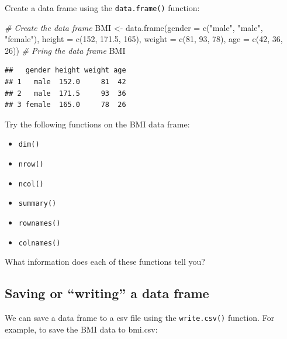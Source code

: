 \documentclass[
]{book}
\newenvironment{Shaded}{\begin{snugshade}}{\end{snugshade}}
\newcommand{\AttributeTok}[1]{\textcolor[rgb]{0.77,0.63,0.00}{#1}}
\newcommand{\CommentTok}[1]{\textcolor[rgb]{0.56,0.35,0.01}{\textit{#1}}}
\newcommand{\DecValTok}[1]{\textcolor[rgb]{0.00,0.00,0.81}{#1}}
\newcommand{\FloatTok}[1]{\textcolor[rgb]{0.00,0.00,0.81}{#1}}
\newcommand{\FunctionTok}[1]{\textcolor[rgb]{0.00,0.00,0.00}{#1}}
\newcommand{\NormalTok}[1]{#1}
\newcommand{\OtherTok}[1]{\textcolor[rgb]{0.56,0.35,0.01}{#1}}
\newcommand{\StringTok}[1]{\textcolor[rgb]{0.31,0.60,0.02}{#1}}
\providecommand{\tightlist}{%
  \setlength{\itemsep}{0pt}\setlength{\parskip}{0pt}}
\begin{document}
Create a data frame using the \texttt{data.frame()} function:

\begin{Shaded}
\begin{Highlighting}[]
\CommentTok{\# Create the data frame}
\NormalTok{BMI }\OtherTok{\textless{}{-}} \FunctionTok{data.frame}\NormalTok{(}\AttributeTok{gender =} \FunctionTok{c}\NormalTok{(}\StringTok{"male"}\NormalTok{, }\StringTok{"male"}\NormalTok{, }\StringTok{"female"}\NormalTok{), }\AttributeTok{height =} \FunctionTok{c}\NormalTok{(}\DecValTok{152}\NormalTok{, }\FloatTok{171.5}\NormalTok{, }\DecValTok{165}\NormalTok{), }\AttributeTok{weight =} \FunctionTok{c}\NormalTok{(}\DecValTok{81}\NormalTok{, }\DecValTok{93}\NormalTok{, }\DecValTok{78}\NormalTok{), }\AttributeTok{age =} \FunctionTok{c}\NormalTok{(}\DecValTok{42}\NormalTok{, }\DecValTok{36}\NormalTok{, }\DecValTok{26}\NormalTok{))}
\CommentTok{\# Pring the data frame}
\NormalTok{BMI}
\end{Highlighting}
\end{Shaded}

\begin{verbatim}
##   gender height weight age
## 1   male  152.0     81  42
## 2   male  171.5     93  36
## 3 female  165.0     78  26
\end{verbatim}

Try the following functions on the BMI data frame:

\begin{itemize}
\tightlist
\item
  \texttt{dim()}
\item
  \texttt{nrow()}
\item
  \texttt{ncol()}
\item
  \texttt{summary()}
\item
  \texttt{rownames()}
\item
  \texttt{colnames()}
\end{itemize}

What information does each of these functions tell you?

\hypertarget{saving-or-writing-a-data-frame}{%
\subsection*{Saving or ``writing'' a data frame}\label{saving-or-writing-a-data-frame}}

We can save a data frame to a csv file using the \texttt{write.csv()} function. For example, to save the BMI data to bmi.csv:
\end{document}
